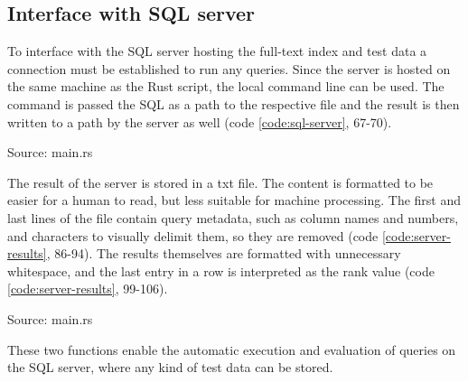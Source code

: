 \subsection{Interface with SQL server}
To interface with the \ac{SQL} server hosting the full-text index and test data a connection must be established to run any queries. Since the server is hosted on the same machine as the Rust script, the local command line can be used. The command is passed the \ac{SQL} as a path to the respective file and the result is then written to a path by the server as well (code \ref{code:sql-server}, 67-70).
\begin{codeenv}
    \label{code:sql-server}
    
    \centerline{Source: main.rs}
\end{codeenv}
The result of the server is stored in a txt file. The content is formatted to be easier for a human to read, but less suitable for machine processing. The first and last lines of the file contain query metadata, such as column names and numbers, and characters to visually delimit them, so they are removed (code \ref{code:server-results}, 86-94). The results themselves are formatted with unnecessary whitespace, and the last entry in a row is interpreted as the rank value (code \ref{code:server-results}, 99-106).
\begin{codeenv}
    \label{code:server-results}
    
    \centerline{Source: main.rs}
\end{codeenv}
These two functions enable the automatic execution and evaluation of queries on the \ac{SQL} server, where any kind of test data can be stored.